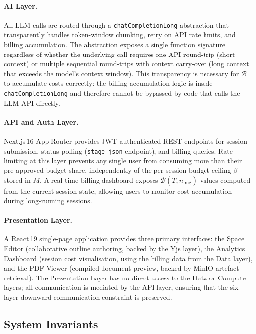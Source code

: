\paragraph{AI Layer.}
All LLM calls are routed through a \texttt{chatCompletionLong} abstraction that
transparently handles token-window chunking, retry on API rate limits, and billing
accumulation.
The abstraction exposes a single function signature regardless of whether the
underlying call requires one API round-trip (short context) or multiple sequential
round-trips with context carry-over (long context that exceeds the model's context
window).
This transparency is necessary for $\mathcal{B}$ to accumulate costs correctly:
the billing accumulation logic is inside \texttt{chatCompletionLong} and therefore
cannot be bypassed by code that calls the LLM API directly.

\paragraph{API and Auth Layer.}
Next.js\,16 App Router provides JWT-authenticated REST endpoints for session
submission, status polling (\texttt{stage\_json} endpoint), and billing queries.
Rate limiting at this layer prevents any single user from consuming more than their
pre-approved budget share, independently of the per-session budget ceiling $\beta$
stored in $M$.
A real-time billing dashboard exposes $\mathcal{B}(T,n_{\mathrm{img}})$ values
computed from the current session state, allowing users to monitor cost accumulation
during long-running sessions.

\paragraph{Presentation Layer.}
A React\,19 single-page application provides three primary interfaces:
the Space Editor (collaborative outline authoring, backed by the Yjs layer),
the Analytics Dashboard (session cost visualisation, using the billing data from
the Data layer), and the PDF Viewer (compiled document preview, backed by MinIO
artefact retrieval).
The Presentation Layer has no direct access to the Data or Compute layers;
all communication is mediated by the API layer, ensuring that the six-layer
downward-communication constraint is preserved.



\subsection{System Invariants}

